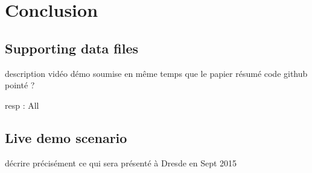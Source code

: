 \documentclass[a4paper]{article}
\begin{document}
  \section{Conclusion}
  
    \subsection{Supporting data files}

description vidéo démo soumise en même temps que le papier
résumé code github pointé ?    

resp : All

    \subsection{Live demo scenario}

décrire précisément ce qui sera présenté à Dresde en Sept 2015

  
  \newpage
  \eightpt
  
  
  
\end{document}
